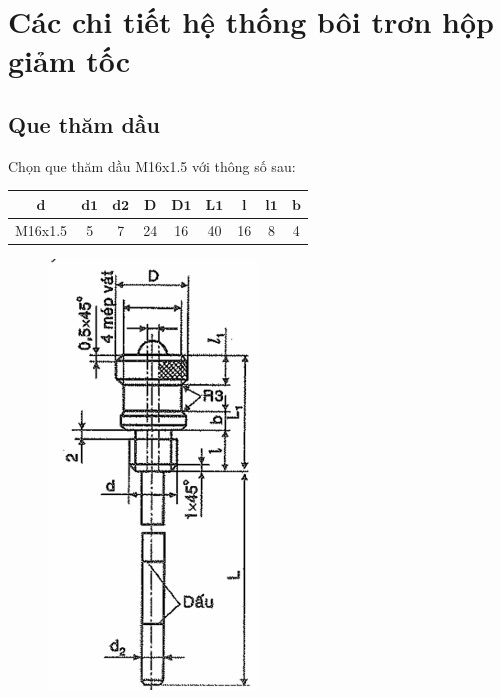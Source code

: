 \section{Các chi tiết hệ thống bôi trơn hộp giảm tốc}
\subsection{Que thăm dầu}
Chọn que thăm dầu M16x1.5 với thông số sau:
\begin{table}[H]
    \centering
    \begin{tabular}{|c|c|c|c|c|c|c|c|c|}
    \hline
    $\mathbf{d}$ & $\mathbf{d1}$ & $\mathbf{d2}$ & $\mathbf{D}$ & $\mathbf{D1}$ & $\mathbf{L1}$ & $\mathbf{l}$ & $\mathbf{l1}$ & $\mathbf{b}$ \\
    \hline
    M16x1.5 & 5 & 7 & 24 & 16 & 40 & 16 & 8 & 4 \\
    \hline
    \end{tabular}
\end{table}
\begin{figure}[H]
    \centering
    \includegraphics[width=0.5\textwidth]{pictures/quethamdau.png}
\end{figure}
\cleardoublepage

